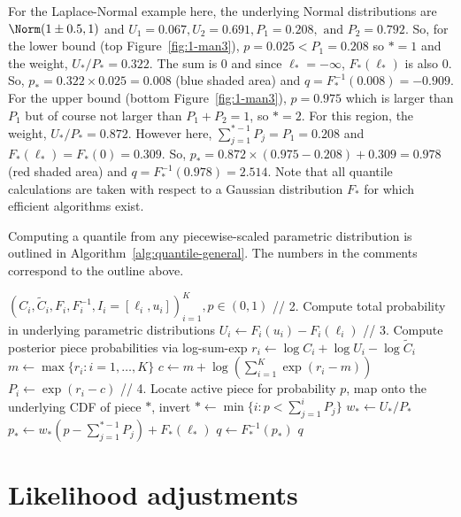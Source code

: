 For the Laplace-Normal example here, the underlying Normal distributions are $\Norm(1 \pm 0.5, 1)$ and
$
U_1 = 0.067,
U_2 = 0.691,
P_1 = 0.208, \text{ and }
P_2 = 0.792.
$
So, for the lower bound (top Figure~\ref{fig:1-man3}), $p = 0.025 < P_1 = 0.208$ so $* = 1$ and the weight, $U_{*}/P_{*} = 0.322$. The sum is $0$ and since $\ell_* = - \infty$, $F_{*}(\ell_*)$ is also $0$. So, $p_* = 0.322 \times 0.025 = 0.008$ (blue shaded area) and $q = F_*^{-1}(0.008) = -0.909$. For the upper bound (bottom Figure~\ref{fig:1-man3}), $p = 0.975$ which is larger than $P_1$ but of course not larger than $P_1 + P_2 = 1$, so $* = 2$. For this region, the weight, $U_{*}/P_{*} = 0.872$. However here, $\sum_{j = 1}^{{*} - 1} P_j = P_1 = 0.208$ and $F_{*}(\ell_*) = F_{*}(0) = 0.309$. So, $p_* = 0.872 \times (0.975 - 0.208) + 0.309 = 0.978$ (red shaded area) and $q = F_*^{-1}(0.978) = 2.514$. Note that all quantile calculations are taken with respect to a Gaussian distribution $F_*$ for which efficient algorithms exist.

Computing a quantile from any piecewise-scaled parametric distribution is outlined in Algorithm~\ref{alg:quantile-general}. The numbers in the comments correspond to the outline above.

\begin{algorithm}
\caption{Quantile of a Piecewise-Scaled Parametric Distribution}
\label{alg:quantile-general}
\begin{algorithmic}[1]
\Require
${(C_i,\tilde{C}_i,F_i,F_i^{-1},I_i=[\ell_i,u_i])}_{i=1}^K, p\in(0,1)$
\Statex
\State // 2. Compute total probability in underlying parametric distributions
\State $U_i \gets F_i(u_i) - F_i(\ell_i)$
\EndFor
\Statex
\State // 3. Compute posterior piece probabilities via log-sum-exp
\State $r_i \gets \log C_i + \log U_i - \log \tilde{C}_i$
\EndFor
\State $m \gets \max\{r_i: i = 1, \ldots, K\}$
\State $c \gets m + \log\left(\sum_{i=1}^K \exp(r_i - m)\right)$
\State $P_i \gets \exp(r_i - c)$
\EndFor
\Statex
\State // 4. Locate active piece for probability $p$, map onto the underlying CDF of piece $*$, invert
\State $* \gets \min\{i : p < \sum_{j=1}^i P_j\}$
\State $w_* \gets U_{*} / P_{*}$ 
\State $p_* \gets w_* (p - \sum_{j = 1}^{{*} - 1} P_j) + F_{*}(\ell_{*})$
\State $q \gets F_{*}^{-1}(p_*)$
\State \Return $q$
\end{algorithmic}
\end{algorithm}

\section{Likelihood adjustments}
\label{sec:review}

